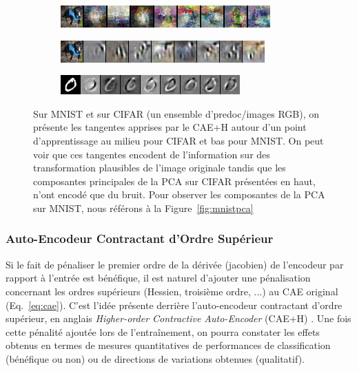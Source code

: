 \begin{figure}
\centering
\begin{subfigure}{0.9\linewidth}
\includegraphics[width=0.9\linewidth]{predoc/images/pca.png}
\label{fig:tan_pca}
\end{subfigure}

\begin{subfigure}{0.9\linewidth}
\includegraphics[width=0.9\linewidth]{predoc/images/tangents_cifar.png}
\label{fig:tan_cifar}
\end{subfigure}

\begin{subfigure}{0.9\linewidth}
\includegraphics[width=0.9\linewidth]{predoc/images/tangents_mnist.png}
\label{fig:tan_mnist}
\end{subfigure}


   \caption[Vecteur Propres du CAE+H sur MNIST et CIFAR]{ Sur MNIST et sur CIFAR (un ensemble d'predoc/images RGB), on présente les
   tangentes apprises par le CAE+H autour d'un point d'apprentissage au milieu pour CIFAR et bas pour MNIST. On peut voir que ces
   tangentes encodent de l'information sur des transformation plausibles de
   l'image originale tandis que les composantes principales de la PCA sur CIFAR présentées en haut, n'ont
   encodé que du bruit. Pour observer les composantes de la PCA sur MNIST, nous référons à la Figure~\ref{fig:mnistpca}
\label{fig:tan}}

\end{figure}

\subsubsection{Auto-Encodeur Contractant d'Ordre Supérieur}

Si le fait de pénaliser le premier ordre de la dérivée (jacobien) de l'encodeur
par rapport à l'entrée est bénéfique, il est naturel d'ajouter une pénalisation
concernant les ordres supérieurs (Hessien, troisième ordre, ...) au CAE
original (Eq.~\ref{eq:cae}).  C'est l'idée présente derrière l'auto-encodeur
contractant d'ordre supérieur, en anglais \textit{Higher-order Contractive
Auto-Encoder} (CAE+H) \citep{Salah+al-2011}.  Une fois cette pénalité ajoutée
lors de l'entraînement, on pourra constater les effets obtenus en termes de
mesures quantitatives de performances de classification (bénéfique ou non) ou
de directions de variations obtenues (qualitatif).


